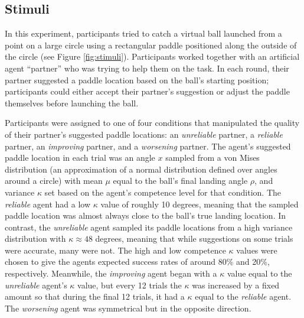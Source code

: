 \documentclass[10pt,letterpaper]{article}
\begin{document}
\subsection{Stimuli}

In this experiment, participants tried to catch a virtual ball launched from a point on a large circle using a rectangular paddle positioned along the outside of the circle (see Figure \ref{fig:stimuli}).\footnotemark{} 
Participants worked together with an artificial agent ``partner'' who was trying to help them on the task. In each round, their partner suggested a paddle location based on the ball's starting position; participants could either accept their partner's suggestion or adjust the paddle themselves before launching the ball.


Participants were assigned to one of four conditions that manipulated the quality of their partner's suggested paddle locations: an \textit{unreliable} partner, a \textit{reliable} partner, an \textit{improving} partner, and a \textit{worsening} partner. The agent's
suggested paddle location in each trial was an angle $x$ sampled from a von Mises distribution (an approximation of a normal distribution defined over angles around a circle) with mean $\mu$ equal to the ball's final landing angle $\rho$, and variance $\kappa$ set based on the agent's competence level for that condition. The \textit{reliable} agent had a low $\kappa$ value of roughly 10 degrees, meaning that the sampled paddle location was almost always close to the ball's true landing location. In contrast, the \textit{unreliable} agent sampled its paddle locations from a high variance distribution with $\kappa \approx 48$ degrees, meaning that while suggestions on some trials were accurate, many were not. The high and low competence $\kappa$ values were chosen to give the agents expected success rates of around 80\% and 20\%, respectively. Meanwhile, the \textit{improving} agent began with a $\kappa$ value equal to the \textit{unreliable} agent's $\kappa$ value, but every 12 trials the $\kappa$ was increased by a fixed amount so that during the final 12 trials, it had a $\kappa$ equal to the \textit{reliable} agent. The \textit{worsening} agent was symmetrical but in the opposite direction.
\end{document}
